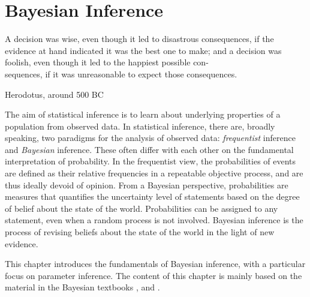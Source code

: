\chapter{Bayesian Inference}\label{chap:bayesian}

\epigraph{A decision was wise, even though it led to disastrous consequences, if the evidence at hand indicated it was the best one to make; and a decision was foolish, even though it led to the happiest possible con-\\sequences, if it was unreasonable to expect those consequences.}{Herodotus, around 500 BC}


The aim of statistical inference is to learn about underlying properties of a population from observed data.  In statistical inference, there are, broadly speaking, two paradigms for the analysis of observed data: \textit{frequentist} inference and \textit{Bayesian} inference. These often differ with each other on the fundamental interpretation of probability. In the frequentist view, the probabilities of events are defined as their relative frequencies in a repeatable objective process, and are thus ideally devoid of opinion. From a Bayesian perspective, probabilities are measures that quantifies the uncertainty level of statements based on the degree of belief about the state of the world. Probabilities can be assigned to any statement, even when a random process is not involved. Bayesian inference is the process of revising beliefs about the state of the world in the light of new evidence.     



This chapter introduces the fundamentals of Bayesian inference, with a particular focus on parameter inference. The content of this chapter is mainly based on the material in the Bayesian textbooks \cite{BDA}, \cite{BAP} and \cite{Sivia}.


